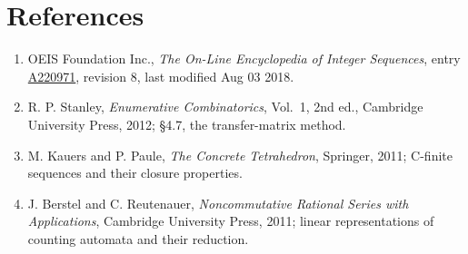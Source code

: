 \documentclass[11pt]{article}
\theoremstyle{definition}
\begin{document}
\section{References}

\begin{enumerate}

\item OEIS Foundation Inc., \emph{The On-Line Encyclopedia of Integer Sequences}, entry \href{https://oeis.org/A220971}{A220971}, revision 8, last modified Aug 03 2018.

\item R. P. Stanley, \emph{Enumerative Combinatorics}, Vol.~1, 2nd ed., Cambridge University Press, 2012; \S4.7, the transfer-matrix method.

\item M. Kauers and P. Paule, \emph{The Concrete Tetrahedron}, Springer, 2011; C-finite sequences and their closure properties.

\item J. Berstel and C. Reutenauer, \emph{Noncommutative Rational Series with Applications}, Cambridge University Press, 2011; linear representations of counting automata and their reduction.

\end{enumerate}
\end{document}
